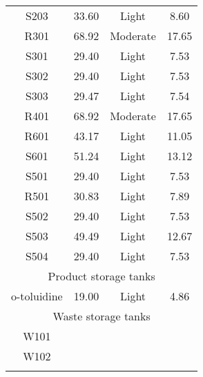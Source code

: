 \begin{table}[H]
\begin{tabular}{cccc}
S203                    & 33.60          & Light                     & 8.60                               \\
R301                    & 68.92          & Moderate                  & 17.65                              \\
S301                    & 29.40          & Light                     & 7.53                               \\
S302                    & 29.40          & Light                     & 7.53                               \\
S303                    & 29.47          & Light                     & 7.54                               \\
R401                    & 68.92          & Moderate                  & 17.65                              \\
R601                    & 43.17          & Light                     & 11.05                              \\
S601                    & 51.24          & Light                     & 13.12                              \\
S501                    & 29.40          & Light                     & 7.53                               \\
R501                    & 30.83          & Light                     & 7.89                               \\
S502                    & 29.40          & Light                     & 7.53                               \\
S503                    & 49.49          & Light                     & 12.67                              \\
S504                    & 29.40          & Light                     & 7.53                               \\\hline
\multicolumn{4}{c}{Product   storage tanks}                                                      \\\hline
o-toluidine             & 19.00          & Light                     & 4.86                               \\\hline
\multicolumn{4}{c}{Waste   storage tanks}                                                        \\\hline
W101                    &                &                           &                                    \\
W102                    &                &                           &                                    \\
                        &                &                           &    \\\bottomrule                           
\end{tabular}
\end{table}